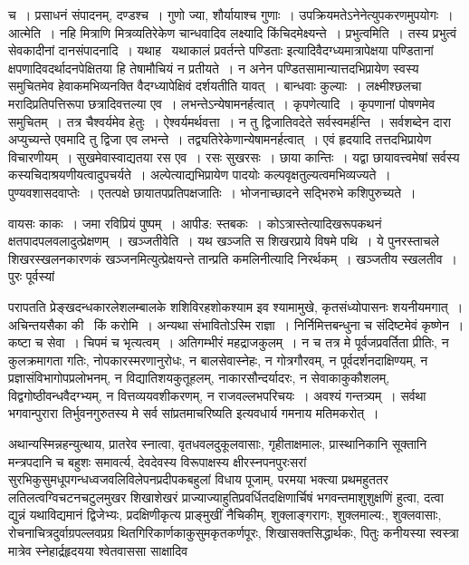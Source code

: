 \documentclass[11pt, openany]{book}
\begin{document}
\noindent
{\s च~। प्रसाधनं संपादनम्, दण्डश्च~। गुणो ज्या, शौर्यायाश्च गुणाः~। उपक्रियमतेऽनेनेत्युपकरणमुपयोगः~। {\qtt आत्मेति}~। नहि मित्राणि मित्रव्यतिरेकेण चान्धवादिव लक्ष्यादि किंचिदमेक्ष्यन्ते~। {\qtt प्रभुत्वमिति}~। तस्य प्रभुत्वं सेवकादीनां दानसंपादनादि~। यथाह \textendash\ {\qt यथाकालं प्रवर्तन्ते पण्डिताः} इत्यादिवैदग्ध्यमात्रापेक्षया पण्डितानां क्षपणादिवदर्थादनपेक्षितया हि तेषामौचियं न प्रतीयते~। न अनेन पण्डितसामान्यात्तदभिप्रायेण स्वस्य समुचितमेव हेवाकमभिव्यनक्ति वैदग्ध्यापेक्षिवं दर्शयतीति यावत्~। बान्धवाः कुल्याः~। लक्ष्मीश्छलचा मरादिप्रतिपत्तिरूपा छत्रादिवत्तल्या एव~। लभन्तेऽन्येषामनर्हत्वात्~। {\qtt कृपणेत्यादि}~। कृपणानां पोषणमेव समुचितम्~। तत्र चैश्वर्यमेव हेतुः~। ऐश्वर्यमर्थवत्ता~। न तु द्विजातिवदेते सर्वस्वमर्हन्ति~। सर्वशब्देन दारा अप्युच्यन्ते एवमादि तु द्विजा एव लभन्ते~। तद्व्यतिरेकेणान्येषामनर्हत्वात्~। एवं हृदयादि तत्तदभिप्रायेण विचारणीयम्~। सुखमेवास्वाद्यतया रस एव~। रसः सुखरसः~। छाया कान्तिः~। यद्वा छायावत्त्वमेषां सर्वस्य कस्यचिदाश्रयणीयत्वादुपचर्यते~। अल्पेत्याद्यभिप्रायेण पादयोः कल्पवृक्षतुल्यत्वमभिव्यज्यते~। पुण्यवशासदवाप्तेः~। एतत्पक्षे छायातपप्रतिपक्षजातिः~। {\qt भोजनाच्छादने सद्भिरुभे कशिपुरुच्यते}~।

वायसः काकः~। जमा रविप्रियं पुष्पम्~। आपीड: स्तबकः~। कोऽत्रास्तेत्यादिखरूपकथनं क्षतपादपलवलादुत्प्रेक्षणम्~। {\qtt खञ्जतीवेति}~। यथ खञ्जति स शिखरप्राये विषमे पथि~। ये पुनरस्ताचले शिखरस्खलनकारणकं खञ्जनमित्युत्प्रेक्षयन्ते तान्प्रति कमलिनीत्यादि निरर्थकम्~। खञ्जतीय स्खलतीव~। पुरः पूर्वस्यां}

\newpage

\noindent
परापतति प्रेङ्खदन्धकारलेशलम्बालके शशिविरहशोकश्याम इव श्यामामुखे, कृतसंध्योपासनः शयनीयमगात्~। अचिन्तयसैका की \textendash\ किं करोमि~। अन्यथा संभावितोऽस्मि राज्ञा~। निर्निमित्तबन्धुना च संदिष्टमेवं कृष्णेन~। कष्टा च सेवा~। चिपमं च भृत्यत्वम्~। अतिगम्भीरं महद्राजकुलम्~। न च तत्र मे पूर्वजप्रवर्तिता प्रीतिः, न कुलक्रमागता गतिः, नोपकारस्मरणानुरोधः, न बालसेवास्नेहः, न गोत्रगौरवम्, न पूर्वदर्शनदाक्षिण्यम्, न प्रज्ञासंविभागोपप्रलोभनम्, न विद्यातिशयकुतूहलम्, नाकारसौन्दर्यादरः, न सेवाकाकुकौशलम्, विद्वगोष्ठीवन्धवैदग्भ्यम्, न वित्तव्ययवशीकरणम्, न राजवल्लभपरिचयः~। अवश्यं गन्तत्र्यम्~। सर्वथा भगवान्पुरारा तिर्भुवनगुरुतस्य मे सर्व सांप्रतमाचरिष्यति इत्यवधार्य गमनाय मतिमकरोत्~।

अथान्यस्मिन्नहन्युत्थाय, प्रातरेव स्नात्वा, वृतधवलदुकूलवासाः, गृहीताक्षमालः, प्रास्थानिकानि सूक्तानि मन्त्रपदानि च बहुशः समावर्त्य, देवदेवस्य विरूपाक्षस्य क्षीरस्नपनपुरःसरां सुरभिकुसुमधूपगन्धध्वजवलिविलेपनप्रदीपकबहुलां विधाय पूजाम्, परमया भक्त्या प्रथमहुततर लतिलत्वग्विचटनचटुलमुखर शिखाशेखरं प्राज्याज्याहुतिप्रवर्धितदक्षिणार्चिषं भगवन्तमाशुशुक्षणिं हुत्वा, दत्वा द्युन्नं यथाविद्यमानं द्विजेभ्यः, प्रदक्षिणीकृत्य प्राङ्मुखीं नैचिकीम्, शुक्लाङ्गरागः, शुक्लमाल्य:, शुक्लवासाः, रोचनाचित्रदुर्वाग्रपल्लवप्रग्र थितगिरिकार्णकाकुसुमकृतकर्णपूरः, शिखासक्तसिद्धार्थकः, पितुः कनीयस्या स्वस्त्रा मात्रेव स्नेहार्द्रहृदयया श्वेतवाससा साक्षादिव
\end{document}
